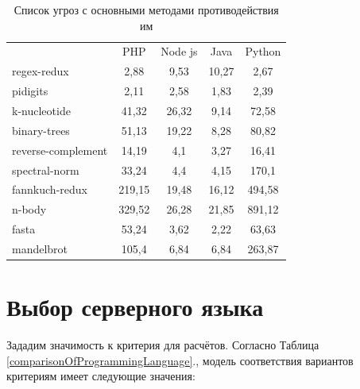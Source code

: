 \begin{table}
	\caption{Список угроз с основными методами противодействия им}
	\label{listOfRisk232}
	\centering
	\begin{tabularx}{\linewidth}{p{4.5cm}cccc}
		& PHP & Node js & Java & Python \\
		regex-redux & \cellcolor[rgb]{0.76,0.84,0.61} 2,88 & 9,53 & \cellcolor[rgb]{0.89,0.42,0.04} 10,27 & \cellcolor[rgb]{0.57,0.82,0.31} 2,67 \\
		pidigits & \cellcolor[rgb]{0.76,0.84,0.61} 2,11 & \cellcolor[rgb]{0.89,0.42,0.04} 2,58 & \cellcolor[rgb]{0.57,0.82,0.31}  1,83 & 2,39 \\
		k-nucleotide & 41,32 & \cellcolor[rgb]{0.76,0.84,0.61} 26,32 & \cellcolor[rgb]{0.57,0.82,0.31} 9,14 & \cellcolor[rgb]{0.89,0.42,0.04} 72,58 \\
		binary-trees & 51,13 & \cellcolor[rgb]{0.76,0.84,0.61} 19,22 & \cellcolor[rgb]{0.57,0.82,0.31} 8,28 & \cellcolor[rgb]{0.89,0.42,0.04} 80,82 \\
		reverse-complement & 14,19 & \cellcolor[rgb]{0.76,0.84,0.61} 4,1 & \cellcolor[rgb]{0.57,0.82,0.31} 3,27 & \cellcolor[rgb]{0.89,0.42,0.04} 16,41 \\
		spectral-norm & 33,24 & \cellcolor[rgb]{0.76,0.84,0.61} 4,4 & \cellcolor[rgb]{0.57,0.82,0.31} 4,15 & \cellcolor[rgb]{0.89,0.42,0.04} 170,1 \\
		fannkuch-redux & 219,15 & \cellcolor[rgb]{0.76,0.84,0.61} 19,48 & \cellcolor[rgb]{0.57,0.82,0.31} 16,12 & \cellcolor[rgb]{0.89,0.42,0.04} 494,58 \\
		n-body & 329,52 & \cellcolor[rgb]{0.76,0.84,0.61} 26,28 & \cellcolor[rgb]{0.57,0.82,0.31} 21,85 & \cellcolor[rgb]{0.89,0.42,0.04} 891,12 \\
		fasta & 53,24 & \cellcolor[rgb]{0.76,0.84,0.61} 3,62 & \cellcolor[rgb]{0.57,0.82,0.31} 2,22 & \cellcolor[rgb]{0.89,0.42,0.04} 63,63 \\
		mandelbrot & 105,4 & \cellcolor[rgb]{0.57,0.82,0.31} 6,84 & \cellcolor[rgb]{0.57,0.82,0.31} 6,84 & \cellcolor[rgb]{0.89,0.42,0.04} 263,87 \\
	\end{tabularx}
\end{table}

\chapter{Выбор серверного языка}
\label{appendix:choosingServerSideLanguage}

Зададим значимость к критерия для расчётов. Согласно Таблица \ref{comparisonOfProgrammingLanguage}., модель соответствия вариантов критериям имеет следующие значения:

